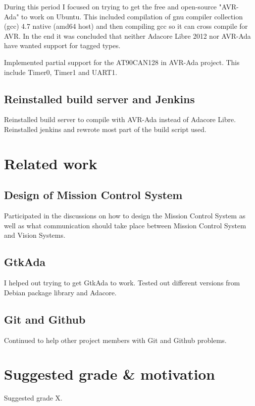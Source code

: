 During this period I focused on trying to get the free and open-source
"AVR-Ada" to work on Ubuntu. This included compilation of gnu compiler
collection (gcc) 4.7 native (amd64 host) and then compiling gcc so it can cross
compile for AVR. In the end it was concluded that neither Adacore Libre 2012
nor AVR-Ada have wanted support for tagged types.

Implemented partial support for the AT90CAN128 in AVR-Ada project. This include
Timer0, Timer1 and UART1. \cite{web:sf_avr_ada}

\subsection{Reinstalled build server and Jenkins}
Reinstalled build server to compile with AVR-Ada instead of Adacore Libre.
Reinstalled jenkins and rewrote most part of the build script used.

\section{Related work}

\subsection{Design of Mission Control System}
Participated in the discussions on how to design the Mission Control System as
well as what communication should take place between Mission Control System and
Vision Systems.

\subsection{GtkAda}
I helped out trying to get GtkAda to work. Tested out different versions from
Debian package library and Adacore.

\subsection{Git and Github}
Continued to help other project members with Git and Github problems.


\section{Suggested grade \& motivation}
Suggested grade X.
